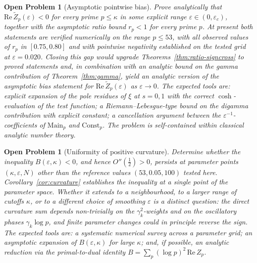 \documentclass[11pt]{article}
\newtheorem{openproblem}[theorem]{Open Problem}
\newcommand{\Zt}{\widetilde{Z}}
\begin{document}
\begin{openproblem}[Asymptotic pointwise bias]
\label{op:bias-asymp}
Prove analytically that $\mathrm{Re}\,\Zt_p(\varepsilon)<0$ for every
prime $p\le\kappa$ in some explicit range $\varepsilon\in(0,\varepsilon_c)$,
together with the asymptotic ratio bound $r_p<1$ for every prime $p$.
At present both statements are verified numerically on the range
$p\le 53$, with all observed values of $r_p$ in $[0.75,0.80]$ and with
pointwise negativity established on the tested grid at
$\varepsilon=0.020$.
Closing this gap would upgrade Theorems~\ref{thm:ratio-signcross}
to proved statements and, in combination with an analytic bound on the
gamma contribution of Theorem~\ref{thm:gamma}, yield an analytic
version of the asymptotic bias statement for
$\mathrm{Re}\,\Zt_p(\varepsilon)$ as $\varepsilon\to 0$.
The expected tools are: explicit expansion of the pole residues of
$\xi$ at $s=0,1$ with the correct $\cosh$-evaluation of the test
function; a Riemann--Lebesgue-type bound on the digamma contribution
with explicit constant; a cancellation argument between the
$\varepsilon^{-1}$-coefficients of $\mathrm{Main}_p$ and
$\mathrm{Const}_p$.
The problem is self-contained within classical analytic number theory.
\end{openproblem}

\begin{openproblem}[Uniformity of positive curvature]
\label{op:uniformity}
Determine whether the inequality $B(\varepsilon,\kappa)<0$, and hence
$O''(\tfrac12)>0$, persists at parameter points
$(\kappa,\varepsilon,N)$ other than the reference values
$(53,0.05,100)$ tested here.
Corollary~\ref{cor:curvature} establishes the inequality at a single
point of the parameter space.
Whether it extends to a neighbourhood, to a larger range of cutoffs
$\kappa$, or to a different choice of smoothing $\varepsilon$ is a
distinct question: the direct curvature sum depends non-trivially on
the $\gamma_k^2$-weights and on the oscillatory phases $\gamma_k\log p$,
and finite parameter changes could in principle reverse the sign.
The expected tools are: a systematic numerical survey across a
parameter grid; an asymptotic expansion of $B(\varepsilon,\kappa)$ for
large $\kappa$; and, if possible, an analytic reduction via the
primal-to-dual identity $B=\sum_p(\log p)^2\,\mathrm{Re}\,Z_p$.
\end{openproblem}
\end{document}
